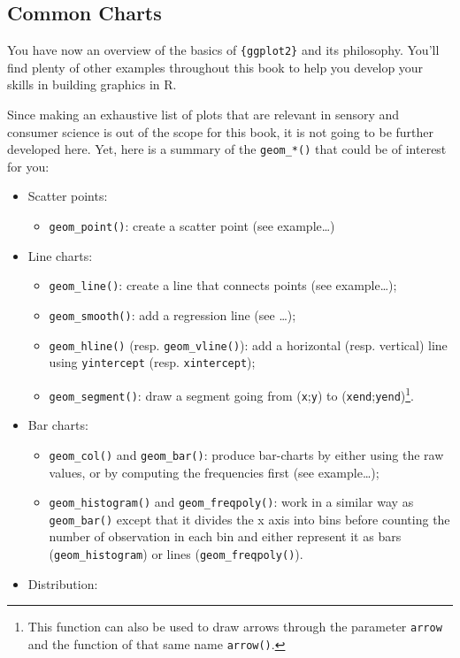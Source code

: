 \documentclass[
]{book}
\providecommand{\tightlist}{%
  \setlength{\itemsep}{0pt}\setlength{\parskip}{0pt}}
\begin{document}
\hypertarget{common-charts}{%
\subsection{Common Charts}\label{common-charts}}

You have now an overview of the basics of \texttt{\{ggplot2\}} and its philosophy. You'll find plenty of other examples throughout this book to help you develop your skills in building graphics in R.

Since making an exhaustive list of plots that are relevant in sensory and consumer science is out of the scope for this book, it is not going to be further developed here. Yet, here is a summary of the \texttt{geom\_*()} that could be of interest for you:

\begin{itemize}
\tightlist
\item
  Scatter points:

  \begin{itemize}
  \tightlist
  \item
    \texttt{geom\_point()}: create a scatter point (see example\ldots)
  \end{itemize}
\item
  Line charts:

  \begin{itemize}
  \tightlist
  \item
    \texttt{geom\_line()}: create a line that connects points (see example\ldots);
  \item
    \texttt{geom\_smooth()}: add a regression line (see \ldots);
  \item
    \texttt{geom\_hline()} (resp. \texttt{geom\_vline()}): add a horizontal (resp. vertical) line using \texttt{yintercept} (resp. \texttt{xintercept});
  \item
    \texttt{geom\_segment()}: draw a segment going from (\texttt{x};\texttt{y}) to (\texttt{xend};\texttt{yend})\footnote{This function can also be used to draw arrows through the parameter \texttt{arrow} and the function of that same name \texttt{arrow()}.}.
  \end{itemize}
\item
  Bar charts:

  \begin{itemize}
  \tightlist
  \item
    \texttt{geom\_col()} and \texttt{geom\_bar()}: produce bar-charts by either using the raw values, or by computing the frequencies first (see example\ldots);
  \item
    \texttt{geom\_histogram()} and \texttt{geom\_freqpoly()}: work in a similar way as \texttt{geom\_bar()} except that it divides the x axis into bins before counting the number of observation in each bin and either represent it as bars (\texttt{geom\_histogram}) or lines (\texttt{geom\_freqpoly()}).
  \end{itemize}
\item
  Distribution:


\end{itemize}
\end{document}
